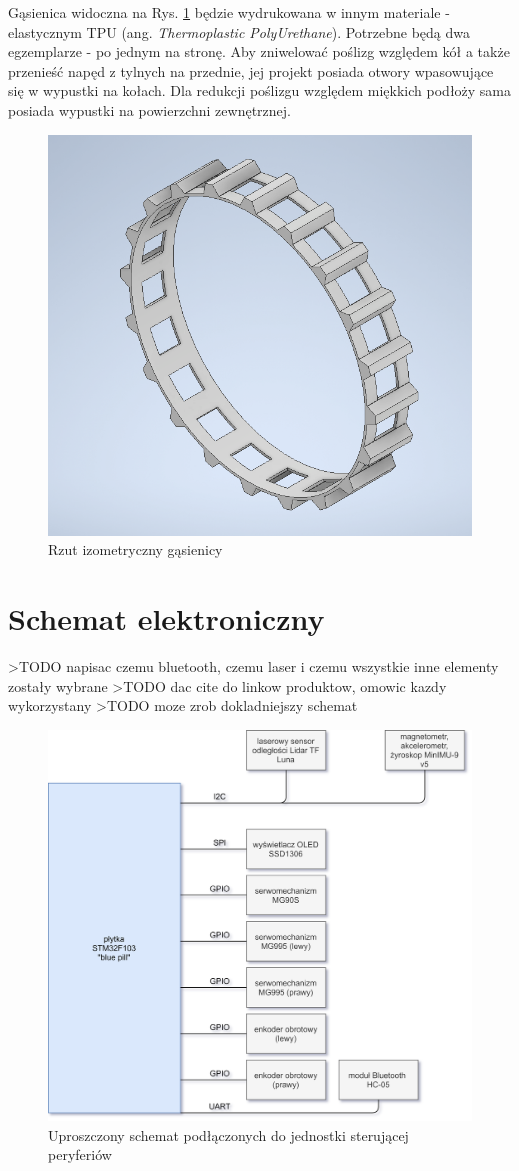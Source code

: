 Gąsienica widoczna na Rys. \ref{fig:tracks} będzie wydrukowana w innym materiale - elastycznym TPU (ang. \emph{Thermoplastic PolyUrethane}). Potrzebne będą dwa egzemplarze - po jednym na stronę. Aby zniwelować poślizg względem kół a także przenieść napęd z tylnych na przednie, jej projekt posiada otwory wpasowujące się w wypustki na kołach. Dla redukcji poślizgu względem miękkich podłoży sama posiada wypustki na powierzchni zewnętrznej.

\begin{figure}[ht]
	\centering
		\includegraphics[width=0.5\linewidth]{rys/tracks-final.png}
	\caption{Rzut izometryczny gąsienicy}
	\label{fig:tracks}
\end{figure}



\section{Schemat elektroniczny}
>TODO napisac czemu bluetooth, czemu laser i czemu wszystkie inne elementy zostały wybrane
>TODO dac cite do linkow produktow, omowic kazdy wykorzystany
>TODO moze zrob dokladniejszy schemat

\begin{figure}[ht]
	\centering
		\includegraphics[width=1\linewidth]{rys/electronic-schematic.png}
	\caption{Uproszczony schemat podłączonych do jednostki sterującej peryferiów}
	\label{fig:electronic-schematic-simplified}
\end{figure}

